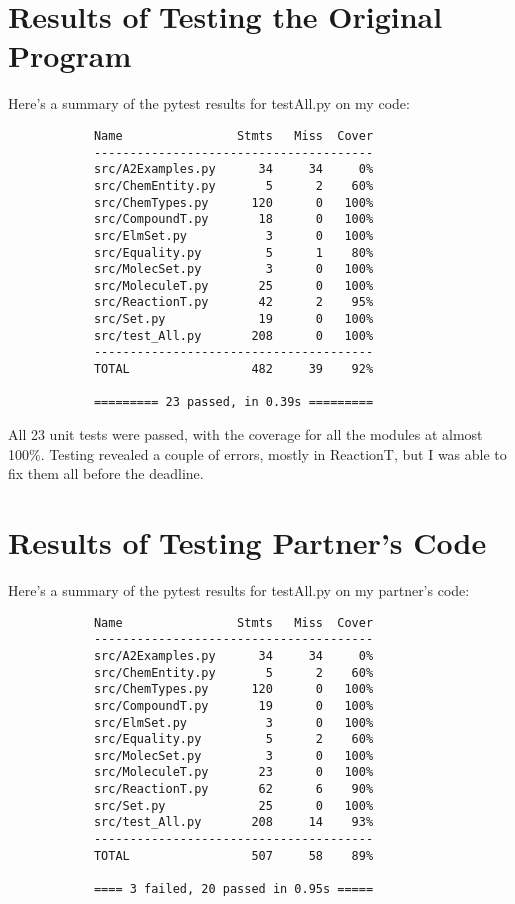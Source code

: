 \documentclass[12pt]{article}
\begin{document}
\section{Results of Testing the Original Program}
Here's a summary of the pytest results for testAll.py on my code:

\begin{lstlisting}
            Name                Stmts   Miss  Cover
            ---------------------------------------
            src/A2Examples.py      34     34     0%
            src/ChemEntity.py       5      2    60%
            src/ChemTypes.py      120      0   100%
            src/CompoundT.py       18      0   100%
            src/ElmSet.py           3      0   100%
            src/Equality.py         5      1    80%
            src/MolecSet.py         3      0   100%
            src/MoleculeT.py       25      0   100%
            src/ReactionT.py       42      2    95%
            src/Set.py             19      0   100%
            src/test_All.py       208      0   100%
            ---------------------------------------
            TOTAL                 482     39    92%

            ========= 23 passed, in 0.39s =========
\end{lstlisting}

All 23 unit tests were passed, with the coverage for all the modules at almost 100\%. Testing revealed a couple of errors, mostly in ReactionT, but I was able to fix them all before the deadline.


\section{Results of Testing Partner's Code}
Here's a summary of the pytest results for testAll.py on my partner's code:
\begin{lstlisting}
            Name                Stmts   Miss  Cover
            ---------------------------------------
            src/A2Examples.py      34     34     0%
            src/ChemEntity.py       5      2    60%
            src/ChemTypes.py      120      0   100%
            src/CompoundT.py       19      0   100%
            src/ElmSet.py           3      0   100%
            src/Equality.py         5      2    60%
            src/MolecSet.py         3      0   100%
            src/MoleculeT.py       23      0   100%
            src/ReactionT.py       62      6    90%
            src/Set.py             25      0   100%
            src/test_All.py       208     14    93%
            ---------------------------------------
            TOTAL                 507     58    89%

            ==== 3 failed, 20 passed in 0.95s =====
\end{lstlisting}
\end{document}
